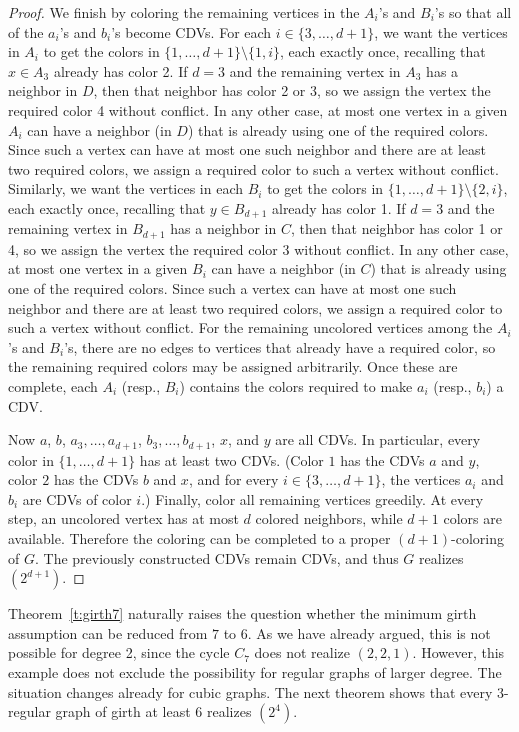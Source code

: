 \documentclass{article}
\theoremstyle{definition}
\begin{document}
\begin{proof}
We finish by coloring the remaining vertices in the $A_i$'s and $B_i$'s so that all of the $a_i$'s and $b_i$'s become CDVs.
For each $i\in\{3,\ldots,d+1\}$, we want the vertices in $A_i$ to get the colors in $\{1,\ldots,d+1\}\setminus\{1,i\}$, each exactly once, recalling that $x\in A_3$ already has color 2.
If $d=3$ and the remaining vertex in $A_3$ has a neighbor in $D$, then that neighbor has color 2 or 3, so we assign the vertex the required color 4 without conflict.
In any other case, at most one vertex in a given $A_i$ can have a neighbor (in $D$) that is already using one of the required colors.
Since such a vertex can have at most one such neighbor and there are at least two required colors, we assign a required color to such a vertex without conflict.
Similarly, we want the vertices in each $B_i$ to get the colors in $\{1,\ldots,d+1\}\setminus\{2,i\}$, each exactly once, recalling that $y\in B_{d+1}$ already has color 1.
If $d=3$ and the remaining vertex in $B_{d+1}$ has a neighbor in $C$, then that neighbor has color 1 or 4, so we assign the vertex the required color 3 without conflict.
In any other case, at most one vertex in a given $B_i$ can have a neighbor (in $C$) that is already using one of the required colors.
Since such a vertex can have at most one such neighbor and there are at least two required colors, we assign a required color to such a vertex without conflict.
For the remaining uncolored vertices among the $A_i$'s and $B_i$'s, there are no edges to vertices that already have a required color, so the remaining required colors may be assigned arbitrarily. Once these are complete, each $A_i$ (resp., $B_i$) contains the colors required to make $a_i$ (resp., $b_i$) a CDV. 

Now $a$, $b$, $a_3,\ldots,a_{d+1}$, $b_3,\ldots,b_{d+1}$, $x$, and $y$ are all CDVs. In particular, every color in $\{1,\ldots,d+1\}$ has at least two CDVs.
(Color $1$ has the CDVs $a$ and $y$, color $2$ has the CDVs $b$ and $x$, and for every $i\in\{3,\ldots,d+1\}$, the vertices $a_i$ and $b_i$ are CDVs of color $i$.) 
Finally, color all remaining vertices greedily. At every step, an uncolored vertex has at most $d$ colored neighbors, while $d+1$ colors are available. Therefore the coloring can be completed to a proper $(d+1)$-coloring of $G$. The previously constructed CDVs remain CDVs, and thus $G$ realizes $(2^{d+1})$.
\end{proof}

\medskip

Theorem~\ref{t:girth7} naturally raises the question whether the minimum girth assumption can be reduced from $7$ to $6$. As we have already argued, this is not possible for degree 2, since the cycle $C_7$ does not realize $(2,2,1)$. However, this example does not exclude the possibility for regular graphs of larger degree. The situation changes already for cubic graphs. The next theorem shows that every $3$-regular graph of girth at least $6$ realizes $(2^4)$.
\end{document}
